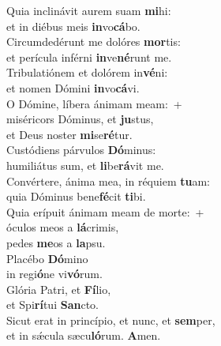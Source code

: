 \evenverse Quia inclinávit aurem suam \textbf{mi}hi:~\*\\
\evenverse et in diébus meis \textbf{in}vo\textbf{cá}bo.\\
\oddverse Circumdedérunt me dolóres \textbf{mor}tis:~\*\\
\oddverse et perícula inférni \textbf{in}ve\textbf{né}runt me.\\
\evenverse Tribulatiónem et dolórem in\textbf{vé}ni:~\*\\
\evenverse et nomen Dómini \textbf{in}vo\textbf{cá}vi.\\
\oddverse O Dómine, líbera ánimam meam:~+\\
\oddverse  miséricors Dóminus, et \textbf{ju}stus,~\*\\
\oddverse et Deus noster \textbf{mi}se\textbf{ré}tur.\\
\evenverse Custódiens párvulos \textbf{Dó}minus:~\*\\
\evenverse humiliátus sum, et \textbf{li}be\textbf{rá}vit me.\\
\oddverse Convértere, ánima mea, in réquiem \textbf{tu}am:~\*\\
\oddverse quia Dóminus bene\textbf{fé}cit \textbf{ti}bi.\\
\evenverse Quia erípuit ánimam meam de morte:~+\\
\evenverse  óculos meos a \textbf{lá}crimis,~\*\\
\evenverse pedes \textbf{me}os a \textbf{la}psu.\\
\oddverse Placébo \textbf{Dó}mino~\*\\
\oddverse in regi\textbf{ó}ne vi\textbf{vó}rum.\\
\evenverse Glória Patri, et \textbf{Fí}lio,~\*\\
\evenverse et Spi\textbf{rí}tui \textbf{San}cto.\\
\oddverse Sicut erat in princípio, et nunc, et \textbf{sem}per,~\*\\
\oddverse et in sǽcula sæcu\textbf{ló}rum. \textbf{A}men.\\
